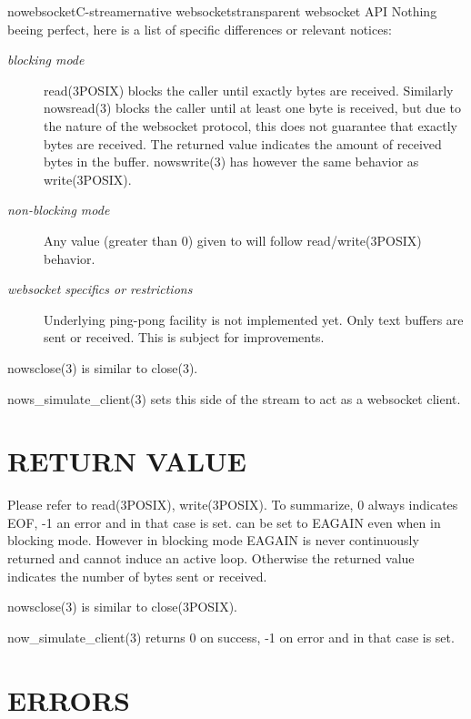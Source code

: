 \documentclass[a4paper,english]{article}
\begin{document}
\begin{Name}{3}{nowebsocket}{C-streamer}{native websockets}{transparent websocket API}
Nothing beeing perfect, here is a list of specific differences or relevant notices:

\begin{description}

\item[\emph{blocking mode}]
    read(3POSIX) blocks the caller until exactly  bytes are
    received.  Similarly nowsread(3) blocks the caller until at least one
    byte is received, but due to the nature of the websocket protocol, this
    does not guarantee that exactly  bytes are received.  The
    returned value indicates the amount of received bytes in the 
    buffer.  nowswrite(3) has however the same behavior as write(3POSIX).

\item[\emph{non-blocking mode}]
    Any value (greater than 0) given to  will follow
    read/write(3POSIX) behavior.

\item[\emph{websocket specifics or restrictions}]
    Underlying ping-pong facility is not implemented yet.  Only text buffers are sent
    or received.  This is subject for improvements.

\end{description}

nowsclose(3) is similar to close(3).

nows_simulate_client(3) sets this side of the stream to act as a websocket
client. 

\section{RETURN VALUE}

Please refer to read(3POSIX), write(3POSIX).  To summarize, 0 always
indicates EOF, -1 an error and in that case  is set.  
can be set to EAGAIN even when in blocking mode.  However in blocking mode
EAGAIN is never continuously returned and cannot induce an active loop. 
Otherwise the returned value indicates the number of bytes sent or received.

nowsclose(3) is similar to close(3POSIX).

now_simulate_client(3) returns 0 on success, -1 on error and in that case
 is set.

\section{ERRORS}


\end{Name}
\end{document}
